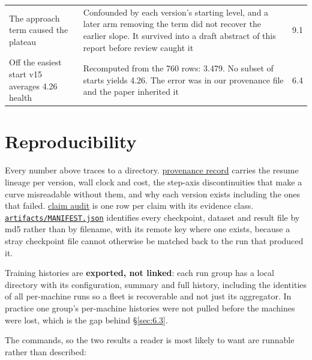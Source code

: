 \documentclass[11pt]{article}
\begin{document}
\begin{table}[!htbp]
\begin{center}
\begin{tabularx}{\linewidth}{@{}XXr@{}}
The approach term caused the plateau & Confounded by each version's starting level, and a later arm removing the term did not recover the earlier slope. It survived into a draft abstract of this report before review caught it & 9.1 \\
Off the easiest start v15 averages 4.26 health & Recomputed from the 760 rows: 3.479. No subset of starts yields 4.26. The error was in our provenance file and the paper inherited it & 6.4 \\
\bottomrule
\end{tabularx}
\end{center}
\end{table}


\section{Reproducibility}
\label{sec:13}

Every number above traces to a directory. \href{https://github.com/JordyKieto/ppo-hyrule/blob/main/PROVENANCE.md}{provenance record} carries the resume lineage per version, wall clock and cost, the step-axis discontinuities that make a curve misreadable without them, and why each version exists including the ones that failed. \href{https://github.com/JordyKieto/ppo-hyrule/blob/main/paper/CLAIMS.md}{claim audit} is one row per claim with its evidence class. \href{https://github.com/JordyKieto/ppo-hyrule/blob/main/artifacts/MANIFEST.json}{\texttt{artifacts/MANIFEST.json}} identifies every checkpoint, dataset and result file by md5 rather than by filename, with its remote key where one exists, because a stray checkpoint file cannot otherwise be matched back to the run that produced it.

Training histories are \textbf{exported, not linked}: each run group has a local directory with its configuration, summary and full history, including the identities of all per-machine runs so a fleet is recoverable and not just its aggregator. In practice one group's per-machine histories were not pulled before the machines were lost, which is the gap behind \S\ref{sec:6.3}.

The commands, so the two results a reader is most likely to want are runnable rather than described:
\end{document}
